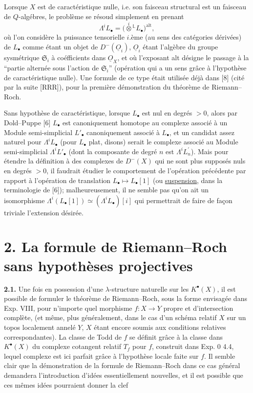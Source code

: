 
Lorsque $X$ est de caractéristique nulle, i.e. son faisceau structural est un faisceau de $Q$-algébres, le problème se résoud simplement en prenant
\begin{equation}\tag{1.2}
 \Lambda^i L_\bullet=\bigl(\overset{i}{\otimes}{}^{\mathbb L}L_\bullet\bigr)^{\mathrm{alt}},
\end{equation}
où l'on considère la puissance tensorielle $i$.ème (au sens des catégories dérivées) de $L_\bullet$ comme étant un objet de $D^-(\underline{O}_i)$, $\underline{O}_i$ étant l'algèbre du groupe sysmétrique $\mathfrak S_i$ à coéfficients dans $\underline{O}_X$, et où l'exposant alt désigne le passage à la ``partie alternée sous l'action de $\mathfrak S_i$'' (opération qui a un sens grâce à l'hypothèse de caractéristique nulle). Une formule de ce type était utilisée déjà dans [8] (cité par la suite [RRR]), pour la première démonstration du théorème de Riemann--Roch.

Sans hypothèse de caractéristique, lorsque $L_\bullet$ est nul en degrés $>0$, alors par Dold--Puppe [6] $L_\bullet$ est canoniquement homotope au complexe associé à un Module semi-simplicial $L'_\bullet$ canoniquement associé à $L_\bullet$, et un candidat assez naturel pour $\Lambda^iL_\bullet$ (pour $L_\bullet$ plat, disons) serait le complexe associé au Module semi-simplicial $\Lambda^iL'_\bullet$ (dont la composante de degré $n$ est $\Lambda^i L^{\prime}_n$). Mais pour étendre la définition à des complexes de $D^-(X)$ qui ne sont plus supposés nuls en degrés $>0$, il faudrait étudier le comportement de l'opération précédente par rapport à l'opération de translation $L_\bullet\mapsto L_\bullet[1]$ (ou \uline{suspension}, dans la terminologie de [6]); malheureusement, il ne semble pas qu'on ait un isomorphisme $\Lambda^i(L_\bullet[1])\simeq(\Lambda^i L_\bullet)[i]$ qui permettrait de faire de façon triviale l'extension désirée.

\section*{2. La formule de Riemann--Roch sans hypothèses projectives}

\textbf{2.1.} Une fois en possession d'une $\lambda$-structure naturelle sur les $K^\bullet(X)$, il est possible de formuler le théorème de Riemann--Roch, sous la forme envisagée dans Exp. VIII, pour n'importe quel morphisme $f:X\to Y$ propre et d'intersection complète, (et même, plus généralement, dans le cas d'un schéma relatif $X$ sur un topos localement annelé $Y$, $X$ étant encore soumis aux conditions relatives correspondantes). La classe de Todd de $f$ se définit grâce à la classe dans $K^\bullet(X)$ du complexe cotangent relatif $T_f$ pour $f$, construit dans Exp. 0 4.4, lequel complexe est ici parfait grâce à l'hypothèse locale faite sur $f$. Il semble clair que la démonstration de la formule de Riemann--Roch dans ce cas général demandera l'introduction d'idées essentiellement nouvelles, et il est possible que ces mêmes idées pourraient donner la clef 

